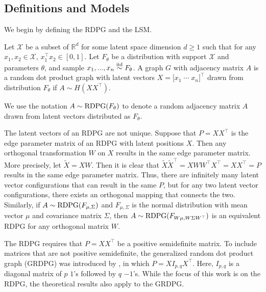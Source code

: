 \documentclass[12pt]{article}
\begin{document}
\subsection{Definitions and Models}\label{definitions-and-models}

We begin by defining the RDPG and the LSM.

\begin{definition}
\label{def:rdpg}
Let $\mathcal{X}$ be a subset of $\mathbb{R}^d$ for some latent space dimension $d \geq 1$ such that for any $x_1, x_2 \in \mathcal{X}$, $x_1^\top x_2 \in [0, 1]$. 
Let $F_\theta$ be a distribution with support $\mathcal{X}$ and parameters $\theta$, and sample $x_1, ..., x_n \stackrel{\mathrm{iid}}{\sim} F_\theta$. 
A graph $G$ with adjacency matrix $A$ is a random dot product graph with latent vectors $X = \bigl[x_1 \; \cdots \; x_n\bigr]^\top$ drawn from distribution $F_\theta$ if $A \sim H(X X^\top)$. 

We use the notation $A \sim \mathrm{RDPG}(F_\theta)$ to denote a random adjacency matrix $A$ drawn from latent vectors distributed as $F_\theta$. 
\end{definition}

\begin{remark}
\label{remark:nonunique}
The latent vectors of an RDPG are not unique. 
Suppose that $P = X X^\top$ is the edge parameter matrix of an RDPG with latent positions $X$. 
Then any orthogonal transformation $W$ on $X$ results in the same edge parameter matrix. 
More precisely, let $\tilde{X} = X W$. 
Then it is clear that $\tilde{X} \tilde{X}^\top = X W W^\top X^\top = X X^\top = P$ results in the same edge parameter matrix. 
Thus, there are infinitely many latent vector configurations that can result in the same $P$, but for any two latent vector configurations, there exists an orthogonal mapping that connects the two. 
Similarly, if $A \sim \mathrm{RDPG}(F_{\mu, \Sigma})$ and $F_{\mu, \Sigma}$ is the normal distribution with mean vector $\mu$ and covariance matrix $\Sigma$, then $A \sim \mathrm{RDPG}(F_{W \mu, W \Sigma W^\top})$ is an equivalent RDPG for any orthogonal matrix $W$. 
\end{remark}

\begin{remark}
\label{remark:grdpg}
The RDPG requires that $P = X X^\top$ be a positive semidefinite matrix. 
To include matrices that are not positive semidefinite, the generalized random dot product graph (GRDPG) was introduced by \citet{rubindelanchy2017statistical}, in which $P = X I_{p,q} X^\top$. 
Here, $I_{p,q}$ is a diagonal matrix of $p$ $1$'s followed by $q$ $-1$'s. 
While the focus of this work is on the RDPG, the theoretical results also apply to the GRDPG. 
\end{remark}
\end{document}
